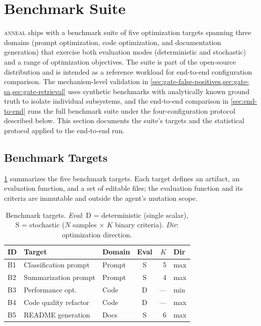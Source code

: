 \section{Benchmark Suite}
\label{sec:evaluation}

\textsc{anneal} ships with a benchmark suite of five optimization targets spanning three domains (prompt optimization, code optimization, and documentation generation) that exercise both evaluation modes (deterministic and stochastic) and a range of optimization objectives.
The suite is part of the open-source distribution and is intended as a reference workload for end-to-end configuration comparison.
The mechanism-level validation in \cref{sec:gate-false-positives,sec:gate-sa,sec:gate-retrieval} uses synthetic benchmarks with analytically known ground truth to isolate individual subsystems, and the end-to-end comparison in \cref{sec:end-to-end} runs the full benchmark suite under the four-configuration protocol described below.
This section documents the suite's targets and the statistical protocol applied to the end-to-end run.

\subsection{Benchmark Targets}
\label{sec:benchmark-suite}

\cref{tab:benchmark-targets} summarizes the five benchmark targets.
Each target defines an artifact, an evaluation function, and a set of editable files; the evaluation function and its criteria are immutable and outside the agent's mutation scope.

\begin{table}[t]
  \centering
  \caption{Benchmark targets. \emph{Eval}: D = deterministic (single scalar), S = stochastic ($N$ samples $\times$ $K$ binary criteria). \emph{Dir}: optimization direction.}
  \label{tab:benchmark-targets}
  \small
  \begin{tabular}{@{}lllcrl@{}}
    \toprule
    ID & Target & Domain & Eval & $K$ & Dir \\
    \midrule
    B1 & Classification prompt & Prompt & S & 5 & max \\
    B2 & Summarization prompt & Prompt & S & 4 & max \\
    B3 & Performance opt. & Code & D & --- & min \\
    B4 & Code quality refactor & Code & D & --- & max \\
    B5 & README generation & Docs & S & 6 & max \\
    \bottomrule
  \end{tabular}
\end{table}

